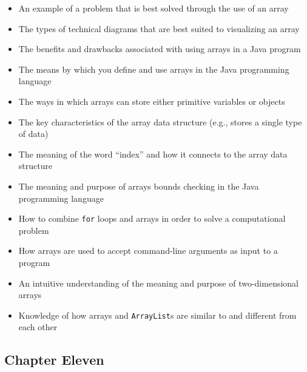 \documentclass[11pt]{article}
\begin{document}
\begin{itemize}

  \item An example of a problem that is best solved through the use of an array
  \item The types of technical diagrams that are best suited to visualizing an array
  \item The benefits and drawbacks associated with using arrays in a Java program
  \item The means by which you define and use arrays in the Java programming language
  \item The ways in which arrays can store either primitive variables or objects
  \item The key characteristics of the array data structure (e.g., stores a single type of data)
  \item The meaning of the word ``index'' and how it connects to the array data structure
  \item The meaning and purpose of arrays bounds checking in the Java programming language
  \item How to combine {\tt for} loops and arrays in order to solve a computational problem
  \item How arrays are used to accept command-line arguments as input to a program
  \item An intuitive understanding of the meaning and purpose of two-dimensional arrays
  \item Knowledge of how arrays and {\tt ArrayList}s are similar to and different from each other

\end{itemize}

\subsection*{Chapter Eleven}
\end{document}
